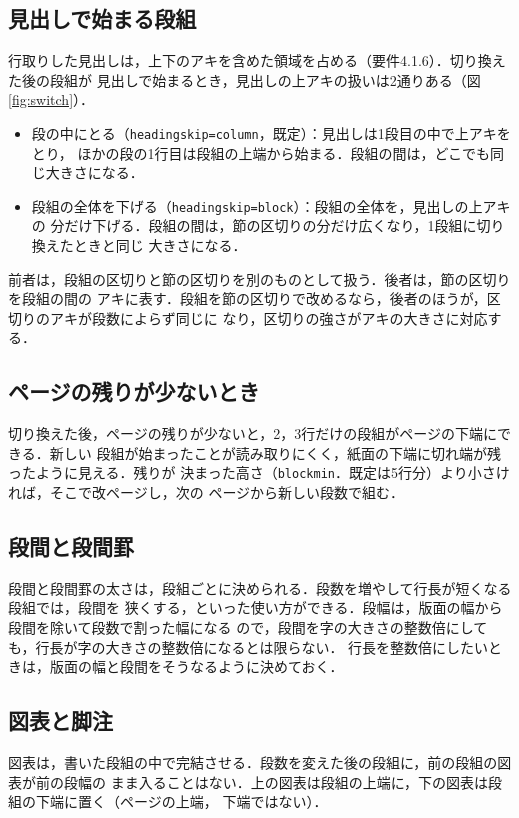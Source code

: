 \documentclass[twocolumn,paper=a4,fontsize=10pt]{jlreq}
\newcommand\opt[1]{\texttt{#1}}
\begin{document}
\subsection{見出しで始まる段組}

行取りした見出しは，上下のアキを含めた領域を占める（要件4.1.6）．切り換えた後の段組が
見出しで始まるとき，見出しの上アキの扱いは2通りある（図\ref{fig:switch}）．
\begin{itemize}
  \item 段の中にとる（\opt{headingskip=column}，既定）：見出しは1段目の中で上アキをとり，
    ほかの段の1行目は段組の上端から始まる．段組の間は，どこでも同じ大きさになる．
  \item 段組の全体を下げる（\opt{headingskip=block}）：段組の全体を，見出しの上アキの
    分だけ下げる．段組の間は，節の区切りの分だけ広くなり，1段組に切り換えたときと同じ
    大きさになる．
\end{itemize}
前者は，段組の区切りと節の区切りを別のものとして扱う．後者は，節の区切りを段組の間の
アキに表す．段組を節の区切りで改めるなら，後者のほうが，区切りのアキが段数によらず同じに
なり，区切りの強さがアキの大きさに対応する．

\subsection{ページの残りが少ないとき}

切り換えた後，ページの残りが少ないと，2，3行だけの段組がページの下端にできる．新しい
段組が始まったことが読み取りにくく，紙面の下端に切れ端が残ったように見える．残りが
決まった高さ（\opt{blockmin}．既定は5行分）より小さければ，そこで改ページし，次の
ページから新しい段数で組む．

\subsection{段間と段間罫}

段間と段間罫の太さは，段組ごとに決められる．段数を増やして行長が短くなる段組では，段間を
狭くする，といった使い方ができる．段幅は，版面の幅から段間を除いて段数で割った幅になる
ので，段間を字の大きさの整数倍にしても，行長が字の大きさの整数倍になるとは限らない．
行長を整数倍にしたいときは，版面の幅と段間をそうなるように決めておく．

\subsection{図表と脚注}

図表は，書いた段組の中で完結させる．段数を変えた後の段組に，前の段組の図表が前の段幅の
まま入ることはない．上の図表は段組の上端に，下の図表は段組の下端に置く（ページの上端，
下端ではない）．
\end{document}

